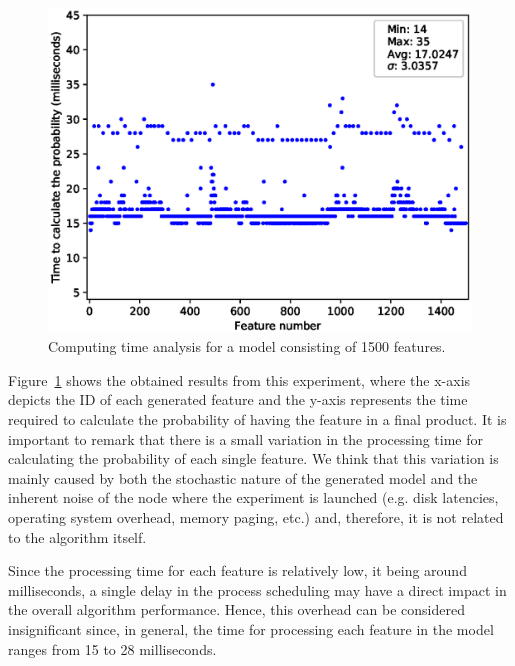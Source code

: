 \begin{figure}[h]
        \centering
        \linefigure
        \includegraphics[width=0.8\hsize,angle=0]{plot_probs_times.eps}
        \linefigure
        \caption{Computing time analysis for a model consisting of 1500 features.}\label{fig:plot:probs:times}
\end{figure}

Figure~\ref{fig:plot:probs:times} shows the obtained
results from this experiment, where the x-axis depicts
the ID of each generated feature and the y-axis represents
the time required to calculate the probability of having the feature in a final product.
It is important to remark that there is a small variation in the processing time for
calculating the probability of each single feature. We think that this variation is
mainly caused by both the stochastic nature of the generated model and the
inherent noise of the node where the experiment is launched (e.g. disk latencies, operating
system overhead, memory paging, etc.) and, therefore, it is not related to the algorithm itself.

Since the processing time for each feature is relatively low, it being around milliseconds, a single delay in
the process scheduling may have a direct impact in the overall algorithm performance. Hence, this overhead
can be considered insignificant since, in general, the time for processing each feature in the model ranges
from 15 to 28 milliseconds.


